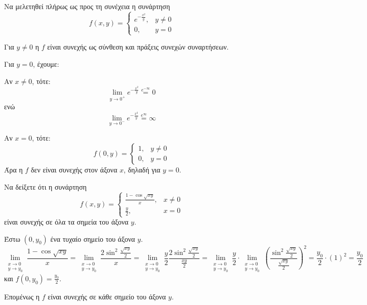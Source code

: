 \begin{example}
  Να μελετηθεί πλήρως ως προς τη συνέχεια η συνάρτηση 
  \[
    f(x,y) = 
    \begin{cases} 
      e^{-\frac{x^{2}}{y}}, & y \neq 0 \\ 0, & y= 0 
    \end{cases}  
  \] 
  \begin{solution}
  \item {}
    Για $ y \neq 0 $ η $f$ είναι συνεχής ως σύνθεση και πράξεις συνεχών 
    συναρτήσεων. 

    Για $ y =0 $, έχουμε:
    \begin{myitemize}
      \item Αν $ x \neq 0 $, τότε:
        \[
          \lim_{y \to 0^{+}} e^{- \frac{x^{2}}{y}} \overset{e^{- \infty}}{=} 0 
        \] 
        ενώ 
        \[
          \lim_{y \to 0^{-}} e^{- \frac{x^{2}}{y}} \overset{e^{\infty}}{=} \infty
        \]
      \item Αν $ x = 0 $, τότε: 
        \[
          f(0,y) = 
          \begin{cases} 
            1, & y \neq 0 \\ 0, & y= 0 
          \end{cases} 
        \] 
        Άρα η $f$ δεν είναι συνεχής στον άξονα $x$, δηλαδή για $ y=0 $.
    \end{myitemize}
  \end{solution}
\end{example}

\begin{example}
  Να δείξετε ότι η συνάρτηση 
  \[
    f(x,y) = 
    \begin{cases} 
      \frac{1 - \cos{\sqrt{xy}}}{x}, & x \neq 0 \\
      \frac{y}{2}, & x=0 
    \end{cases} 
  \] 
  είναι συνεχής σε όλα τα σημεία του άξονα $y$.
  \begin{solution}
  \item {}
    Έστω $ (0, y_{0}) $ ένα τυχαίο σημείο 
    του άξονα $y$. 
    \[
      \lim\limits_{\substack{x\to 0 \\y \to y_0}} 
      \frac{1 - \cos{\sqrt{xy}}}{x} = 
      \lim\limits_{\substack{x\to 0 \\y \to y_0}} \frac{2
        \sin^{2}{\frac{\sqrt{xy}}{2}}}{x} = \lim\limits_{\substack{x\to 0 \\y
      \to y_0}} \frac{y}{2} 
      \frac{2\sin^{2}{\frac{\sqrt{xy}}{2}}}{\frac{xy}{2}} =
      \lim\limits_{\substack{x\to 0 \\y \to y_0}} \frac{y}{2} \cdot
      \lim\limits_{\substack{x\to 0 \\y \to y_0}} 
      \left(\frac{\sin^{2}{\frac{\sqrt{xy} }{2}
      }}{\frac{\sqrt{xy}}{2}} \right)^{2} = \frac{y_0}{2} \cdot (1)^{2} =
      \frac{y_{0}}{2} 
    \] 
    και 
    $ f(0, y_{0}) = \frac{y_{0}}{2} $.

    Επομένως η $f$ είναι συνεχής σε κάθε σημείο του άξονα $y$.
  \end{solution}
\end{example}


